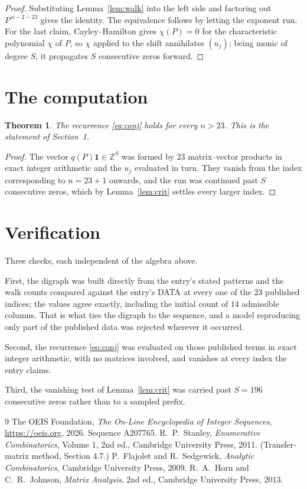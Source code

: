 \documentclass[11pt,a4paper]{article}
\theoremstyle{plain}
\newtheorem{theorem}{Theorem}
\theoremstyle{definition}
\begin{document}
\begin{proof}
Substituting Lemma~\ref{lem:walk} into the left side and factoring out
$P^{\,n-2-23}$ gives the identity. The equivalence follows by letting the exponent
run. For the last claim, Cayley--Hamilton gives $\chi(P)=0$ for the characteristic
polynomial $\chi$ of $P$, so $\chi$ applied to the shift annihilates $(u_j)$; being monic of
degree $S$, it propagates $S$ consecutive zeros forward.
\end{proof}

\section{The computation}

\begin{theorem}
The recurrence \eqref{eq:conj} holds for every $n>23$. This is the statement of
Section~1.
\end{theorem}

\begin{proof}
The vector $q(P)\mathbf{1}\in\mathbb{Z}^{S}$ was formed by $23$ matrix--vector
products in exact integer arithmetic and the $u_j$ evaluated in turn. They vanish from the
index corresponding to $n=23+1$ onwards, and the run was continued past $S$ consecutive
zeros, which by Lemma~\ref{lem:crit} settles every larger index.
\end{proof}

\section{Verification}

Three checks, each independent of the algebra above.

First, the digraph was built directly from the entry's stated patterns and the walk counts
compared against the entry's DATA at every one of the $23$ published indices; the
values agree exactly, including the initial count of $14$ admissible columns. That is
what ties the digraph to the sequence, and a model reproducing only part of the published
data was rejected wherever it occurred.

Second, the recurrence \eqref{eq:conj} was evaluated on those published terms in exact
integer arithmetic, with no matrices involved, and vanishes at every index the entry claims.

Third, the vanishing test of Lemma~\ref{lem:crit} was carried past $S=196$ consecutive
zeros rather than to a sampled prefix.

\begin{thebibliography}{9}
 The OEIS Foundation, \emph{The On-Line Encyclopedia of Integer
Sequences}, \url{https://oeis.org}, 2026. Sequence A207765.
 R.~P.~Stanley, \emph{Enumerative Combinatorics}, Volume 1, 2nd ed.,
Cambridge University Press, 2011. (Transfer-matrix method, Section 4.7.)
 P.~Flajolet and R.~Sedgewick, \emph{Analytic Combinatorics}, Cambridge
University Press, 2009.
 R.~A.~Horn and C.~R.~Johnson, \emph{Matrix Analysis}, 2nd ed., Cambridge
University Press, 2013.
\end{thebibliography}
\end{document}
